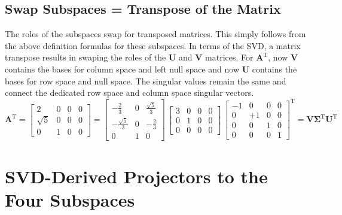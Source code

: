 \documentclass[a4paper, 11pt]{scrartcl}
\begin{document}
\subsection{Swap Subspaces = Transpose of the Matrix}
The roles of the subspaces swap for transposed matrices. This simply follows from the above definition formulas for these subspaces. In terms of the SVD, a matrix transpose results in swaping the roles of the $\bm{U}$ and $\bm{V}$ matrices. For $\bm{A}^\mathrm{T}$, now $\bm{V}$ contains the bases for column space and left null space and now $\bm{U}$ contains the bases for row space and null space. The singular values remain the same and  connect the dedicated row space and column space singular vectors.
$$
\bm{A}^\mathrm{T} =
\begin{bmatrix}
2 & 0 & 0 & 0\\
\sqrt{5} & 0 & 0 & 0\\
0 & 1 & 0 & 0
\end{bmatrix}
=
\begin{bmatrix}
-\frac{2}{3} & 0 & \frac{\sqrt{5}}{3}\\
-\frac{\sqrt{5}}{3} & 0 & -\frac{2}{3}\\
0 & 1 & 0
\end{bmatrix}
\,
\begin{bmatrix}
3 & 0 & 0 & 0\\
0 & 1 & 0 & 0\\
0 & 0 & 0 & 0
\end{bmatrix}
\,
\begin{bmatrix}
-1 & 0 & 0 & 0\\
0 & +1 & 0 & 0\\
0 & 0 & 1 & 0\\
0 & 0 & 0 & 1
\end{bmatrix}^\mathrm{T}
= \bm{V} \bm{\Sigma}^\mathrm{T} \bm{U}^\mathrm{T}
$$

\newpage
\section{SVD-Derived Projectors to the Four Subspaces}
\end{document}
